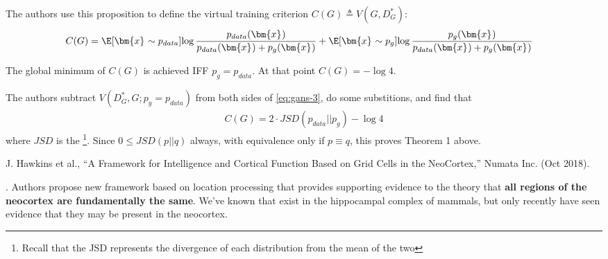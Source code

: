 \documentclass[11pt]{article}
\renewcommand\vec[2][]{\bm{#2}_{#1}}
\newcommand\p{\Needspace{10\baselineskip} \noindent}
\begin{document}
The authors use this proposition to define the virtual training criterion $C(G) \triangleq V(G, D^*_G)$:
\begin{align}
	C(G)
		&= \E[\vec x \sim p_{data}]{\log    \frac{ p_{data}(\vec x) }{ p_{data}(\vec x) + p_g(\vec x) }      } 
		+  \E[\vec x \sim p_{g}]{\log    \frac{ p_{g}(\vec x) }{ p_{data}(\vec x) + p_g(\vec x) }      } \label{eq:gans-3}
\end{align}

\begin{definition}[-1em][Theorem 1.]
	The global minimum of $C(G)$ is achieved IFF $p_g = p_{data}$. At that point $C(G) = - \log4$. 
\end{definition}

\begin{example}
	The authors subtract $V(D^*_G, G; p_g{=}p_{data})$ from both sides of \ref{eq:gans-3}, do some substitions, and find that
	\begin{align}
		C(G) = 2 \cdot JSD(p_{data} || p_g) - \log 4
	\end{align}
	where $JSD$ is the \footnote{Recall that the JSD represents the divergence of each distribution from the mean of the two}. Since $0 \le JSD(p || q)$ always, with equivalence only if $p \equiv q$, this proves Theorem 1 above.
\end{example}
















\vspace{-1em}
{\footnotesize J. Hawkins et al., ``A Framework for Intelligence and Cortical Function Based on Grid Cells in the NeoCortex,'' Numata Inc. (Oct 2018).}


\p {}. Authors propose new framework based on location processing that provides supporting evidence to the theory that \textbf{all regions of the neocortex are fundamentally the same}. We've known that  exist in the hippocampal complex of mammals, but only recently have seen evidence that they may be present in the neocortex.
\end{document}
